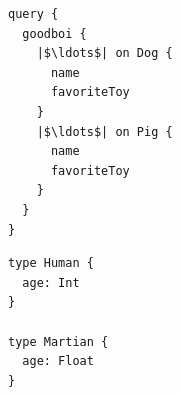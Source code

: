 \begin{minipage}[t]{.25\textwidth}
\begin{verbatim}
query {
  goodboi {
    |$\ldots$| on Dog {
      name
      favoriteToy
    }
    |$\ldots$| on Pig {
      name
      favoriteToy
    }
  }
}
\end{verbatim}
\end{minipage}%
\begin{minipage}[t]{.25\textwidth}
\begin{verbatim}   
type Human {
  age: Int
}

type Martian {
  age: Float
}	
\end{verbatim}
\end{minipage}




